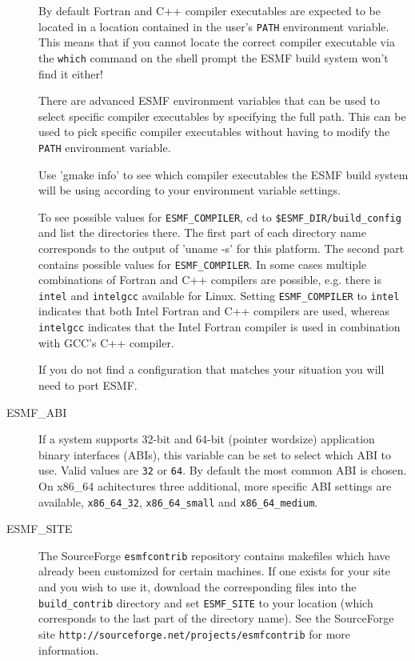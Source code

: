 \begin{description}
By default Fortran and C++ compiler executables are expected to be located in
a location contained in the user's {\tt PATH} environment variable. This means
that if you cannot locate the correct compiler executable via the {\tt which}
command on the shell prompt the ESMF build system won't find it either!

There are advanced ESMF environment variables that can be used to select 
specific compiler executables by specifying the full path. This can be used to
pick specific compiler executables without having to modify the {\tt PATH}
environment variable.

Use 'gmake info' to see which compiler executables the ESMF build system will
be using according to your environment variable settings.

To see possible values for {\tt ESMF\_COMPILER}, cd to 
{\tt \$ESMF\_DIR/build\_config} and list the directories there. The first part 
of each directory name corresponds to the output of 'uname -s' for this 
platform. The second part contains possible values for {\tt ESMF\_COMPILER}. In
some cases multiple combinations of Fortran and C++ compilers are possible, e.g.
there is {\tt intel} and {\tt intelgcc} available for Linux. Setting 
{\tt ESMF\_COMPILER} to {\tt intel} indicates that both Intel Fortran and 
C++ compilers are used, whereas {\tt intelgcc} indicates that the Intel Fortran
compiler is used in combination with GCC's C++ compiler.

If you do not find a configuration that matches your situation you will need to
port ESMF.

\item[ESMF\_ABI]
If a system supports 32-bit and 64-bit (pointer wordsize) application binary
interfaces (ABIs), this variable can be set to select which ABI to use. Valid 
values are {\tt 32} or {\tt 64}. By default the most common ABI is chosen. On
x86\_64 achitectures three additional, more specific ABI settings are available,
{\tt x86\_64\_32}, {\tt x86\_64\_small} and {\tt x86\_64\_medium}.

\item[ESMF\_SITE]
The SourceForge {\tt esmfcontrib} repository contains makefiles which have 
already been customized for certain machines.  If one exists for your site 
and you wish to use it, download the corresponding files into the 
{\tt build\_contrib} directory and set {\tt ESMF\_SITE} to your location
(which corresponds to the last part of the directory name).  See the 
SourceForge site {\tt http://sourceforge.net/projects/esmfcontrib} for more 
information.


\end{description}
